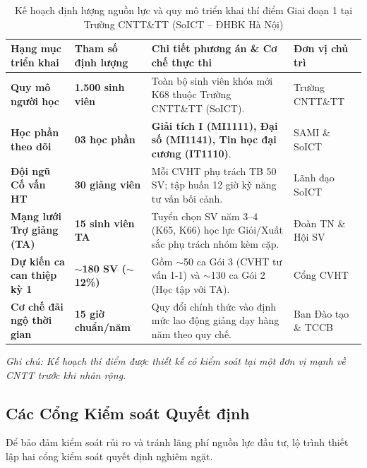 \begin{table}[htbp]
\centering
\caption{Kế hoạch định lượng nguồn lực và quy mô triển khai thí điểm Giai đoạn 1 tại Trường CNTT\&TT (SoICT -- ĐHBK Hà Nội)}
\label{tab:thi_diem_soict}
\vspace{0.2cm}
\begin{tabularx}{\textwidth}{|L{3.2cm}|C{2.4cm}|Y|L{2.8cm}|}
\hline
\textbf{Hạng mục triển khai} & \textbf{Tham số định lượng} & \textbf{Chi tiết phương án \& Cơ chế thực thi} & \textbf{Đơn vị chủ trì} \\
\hline
\textbf{Quy mô người học} & \textbf{1.500 sinh viên} & Toàn bộ sinh viên khóa mới K68 thuộc Trường CNTT\&TT (SoICT). & Trường CNTT\&TT \\
\hline
\textbf{Học phần theo dõi} & \textbf{03 học phần} & \textbf{Giải tích I (MI1111), Đại số (MI1141), Tin học đại cương (IT1110)}. & SAMI \& SoICT \\
\hline
\textbf{Đội ngũ Cố vấn HT} & \textbf{30 giảng viên} & Mỗi CVHT phụ trách TB 50 SV; tập huấn 12 giờ kỹ năng tư vấn bối cảnh. & Lãnh đạo SoICT \\
\hline
\textbf{Mạng lưới Trợ giảng (TA)} & \textbf{15 sinh viên TA} & Tuyển chọn SV năm 3--4 (K65, K66) học lực Giỏi/Xuất sắc phụ trách nhóm kèm cặp. & Đoàn TN \& Hội SV \\
\hline
\textbf{Dự kiến ca can thiệp kỳ 1} & \textbf{$\sim$180 SV ($\sim$12\%)} & Gồm $\sim$50 ca Gói 3 (CVHT tư vấn 1-1) và $\sim$130 ca Gói 2 (Học tập với TA). & Cổng CVHT \\
\hline
\textbf{Cơ chế đãi ngộ thời gian} & \textbf{15 giờ chuẩn/năm} & Quy đổi chính thức vào định mức lao động giảng dạy hàng năm theo quy chế. & Ban Đào tạo \& TCCB \\
\hline
\end{tabularx}
\begin{flushleft}
\textit{\fontsize{8}{10}\selectfont Ghi chú: Kế hoạch thí điểm được thiết kế có kiểm soát tại một đơn vị mạnh về CNTT trước khi nhân rộng.}
\end{flushleft}
\end{table}

\subsection{Các Cổng Kiểm soát Quyết định}
Để bảo đảm kiểm soát rủi ro và tránh lãng phí nguồn lực đầu tư, lộ trình thiết lập hai cổng kiểm soát quyết định nghiêm ngặt.

